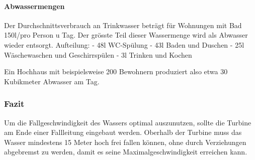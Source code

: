 \paragraph{Abwassermengen}
Der Durchschnittsverbrauch an Trinkwasser beträgt für Wohnungen mit Bad 150l/pro Person u Tag. Der grösste Teil dieser Wassermenge wird als Abwasser wieder entsorgt. 
\newline
Aufteilung:
\newline
- 48l \; WC-Spülung
\newline
- 43l \; Baden und Duschen
\newline
- 25l \; Wäschewaschen und Geschirrspülen
\newline
- 3l \;  Trinken und Kochen
\newline
\cite{wohnbau}

Ein Hochhaus mit beispielsweise 200 Bewohnern produziert also etwa 30 Kubikmeter Abwasser am Tag.

\subsubsection{Fazit}
Um die Fallgeschwindigkeit des Wassers optimal auszunutzen, sollte die Turbine am Ende einer Fallleitung eingebaut werden. Oberhalb der Turbine muss das Wasser mindestens 15 Meter hoch frei fallen können, ohne durch Verziehungen abgebremst zu werden, damit es seine Maximalgeschwindigkeit erreichen kann. 


\clearpage 






